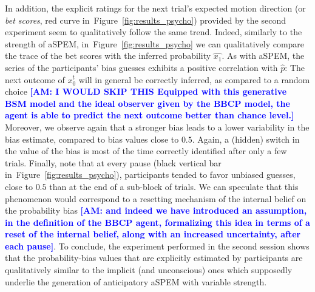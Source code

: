 \documentclass[12pt,english]{article}%
\newcommand{\seeFig}[1]{Figure~\ref{fig:#1}}
\newcommand{\AM}[1]{\textbf{\textcolor{blue}{[AM: #1]}}}
\begin{document}
In addition, the explicit ratings
for the next trial's expected motion direction (or \textit{bet scores}, red curve in~\seeFig{results_psycho})
provided by the second experiment
seem to qualitatively follow the same trend.
Indeed, similarly to the strength of aSPEM, in~\seeFig{results_psycho} we can qualitatively compare
the trace of the bet scores
with the inferred probability $\hat{x_1}$.
As with aSPEM, the series of the participants' bias guesses
exhibits a positive correlation with $\hat{p}$:
The next outcome of $x_{0}^{t}$ will in general be correctly inferred,
as compared to a random choice
\AM{I WOULD SKIP THIS Equipped with this generative BSM model and the ideal observer given by the BBCP model,
the agent is able to predict the next outcome better than chance level.}
Moreover, we observe again that a stronger bias leads to a lower variability in the bias estimate, compared to bias values close to $0.5$.
Again, a (hidden) switch in the value of the bias is
most of the time correctly identified after only a few trials.
Finally, note that at every pause (black vertical bar in~\seeFig{results_psycho}),
participants tended to favor unbiased guesses, close to $0.5$
than at the end of a sub-block of trials.
We can speculate that this phenomenon would correspond
to a resetting mechanism of the internal belief on the probability bias \AM{and indeed we have introduced an assumption, in the definition of the BBCP agent, formalizing this idea in terms of a reset of the internal belief, along with an increased uncertainty, after each pause}.
To conclude, the experiment performed in the second session
shows that the probability-bias values that are explicitly estimated by participants
are qualitatively similar to the implicit (and unconscious) ones
which supposedly underlie the generation of anticipatory aSPEM with variable strength.
\end{document}
